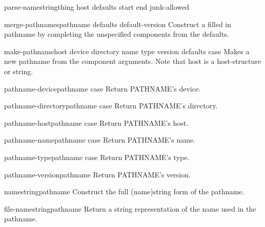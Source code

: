 \documentclass[10pt,english]{book}
\begin{document}
\begin{function}{parse-namestring}{thing \op host defaults \key start end junk-allowed}
  
\end{function}

\begin{function}{merge-pathnames}{pathname \op defaults default-version}
  Construct a filled in pathname by completing the unspecified components
   from the defaults.
\end{function}

\begin{function}{make-pathname}{\key host device directory name type version defaults case}
  Makes a new pathname from the component arguments. Note that host is
a host-structure or string.
\end{function}

\begin{function}{pathname-device}{pathname \key case}
  Return PATHNAME's device.
\end{function}

\begin{function}{pathname-directory}{pathname \key case}
  Return PATHNAME's directory.
\end{function}

\begin{function}{pathname-host}{pathname \key case}
  Return PATHNAME's host.
\end{function}

\begin{function}{pathname-name}{pathname \key case}
  Return PATHNAME's name.
\end{function}

\begin{function}{pathname-type}{pathname \key case}
  Return PATHNAME's type.
\end{function}

\begin{function}{pathname-version}{pathname}
  Return PATHNAME's version.
\end{function}

\begin{function}{namestring}{pathname}
  Construct the full (name)string form of the pathname.
\end{function}

\begin{function}{file-namestring}{pathname}
  Return a string representation of the name used in the pathname.
\end{function}
\end{document}
